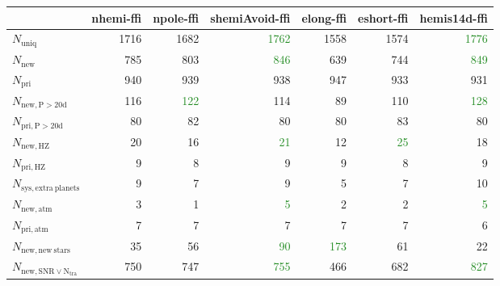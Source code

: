 \begin{tabular}{lrrrrrr}
\toprule
{} &  nhemi-ffi &  npole-ffi &  shemiAvoid-ffi &  elong-ffi &  eshort-ffi &  hemis14d-ffi \\
\midrule
$N_{\mathrm{uniq}}$                &       1716 &       1682 &            \textcolor{ForestGreen}{1762} &       1558 &        1574 &          \textcolor{ForestGreen}{1776} \\
$N_{\mathrm{new}}$                 &        785 &        803 &             \textcolor{ForestGreen}{846} &        639 &         744 &           \textcolor{ForestGreen}{849} \\
$N_{\mathrm{pri}}$                 &        940 &        939 &             938 &        947 &         933 &           931 \\
$N_{\mathrm{new,P>20d}}$           &        116 &        \textcolor{ForestGreen}{122} &             114 &         89 &         110 &           \textcolor{ForestGreen}{128} \\
$N_{\mathrm{pri,P>20d}}$           &         80 &         82 &              80 &         80 &          83 &            80 \\
$N_{\mathrm{new,HZ}}$              &         20 &         16 &              \textcolor{ForestGreen}{21} &         12 &          \textcolor{ForestGreen}{25} &            18 \\
$N_{\mathrm{pri,HZ}}$              &          9 &          8 &               9 &          9 &           8 &             9 \\
$N_{\mathrm{sys,extra\ planets}}$  &          9 &          7 &               9 &          5 &           7 &            10 \\
$N_{\mathrm{new,atm}}$             &        3 &         1 &             \textcolor{ForestGreen}{5} &        2 &         2 &           \textcolor{ForestGreen}{5} \\
$N_{\mathrm{pri,atm}}$             &        7 &        7 &             7 &        7 &         7 &           6 \\
$N_{\mathrm{new,new\ stars}}$      &         35 &         56 &              \textcolor{ForestGreen}{90} &        \textcolor{ForestGreen}{173} &          61 &            22 \\
$N_{\mathrm{new,SNR\lor N_{tra}}}$ &        750 &        747 &             \textcolor{ForestGreen}{755} &        466 &         682 &           \textcolor{ForestGreen}{827} \\
\bottomrule
\end{tabular}
